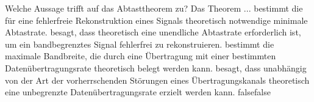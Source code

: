     {Welche Aussage trifft auf das Abtasttheorem zu? Das Theorem ...}
    {bestimmt die für eine fehlerfreie Rekonstruktion eines Signals theoretisch notwendige minimale Abtastrate.}
    {besagt, dass theoretisch eine unendliche Abtastrate erforderlich ist, um ein bandbegrenztes Signal fehlerfrei zu rekonstruieren.}
    {bestimmt die maximale Bandbreite, die durch eine Übertragung mit einer bestimmten Datenübertragungsrate theoretisch belegt werden kann.}
    {besagt, dass unabhängig von der Art der vorherrschenden Störungen eines Übertragungskanals theoretisch eine unbegrenzte Datenübertragungsrate erzielt werden kann.}
    {false}{false}
